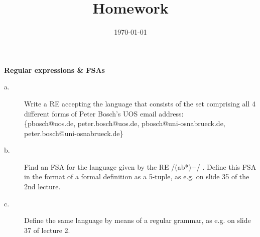 \documentclass[11pt]{article}
\title{Homework \hwnumber} %
\author{\myname} %
\date{\textbf{\mycourse} \hfill {\today} \hfill \textbf{\semesteryear}} %
\begin{document}
\thispagestyle{empty} %

\clearpage %
\maketitle


\begin{problem}{1}
\textbf{Regular expressions \& FSAs}
\begin{description}
	\item[a.] Write a RE accepting the language that consists of the set comprising all 4 different forms of Peter Bosch's UOS email address: \\
	\textsf{ \{pbosch@uos.de, peter.bosch@uos.de, pbosch@uni‐osnabrueck.de, peter.bosch@uni‐osnabrueck.de\} }
 
	\item[b.] Find an FSA for the language given by the RE /(ab*)+/ . Define this FSA in the format of a formal definition as a 5-tuple, as e.g. on slide 35 of the 2nd lecture.
	\item[c.] Define the same language by means of a regular grammar, as e.g. on slide 37 of lecture 2.
\end{description}
\end{problem}

\newpage
\end{document}
